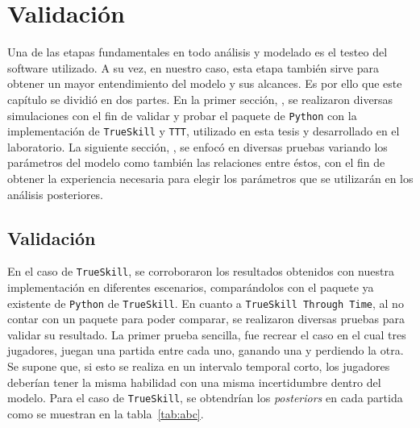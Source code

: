\documentclass[11pt,twoside,spanish]{report} %
\begin{document}





\chapter{Validaci\'on}
Una de las etapas fundamentales en todo an\'alisis y modelado es el testeo del software utilizado.
A su vez, en nuestro caso, esta etapa tambi\'en sirve para obtener un mayor entendimiento del modelo y sus alcances.
Es por ello que este cap\'itulo se dividi\'o en dos partes.
En la primer secci\'on, , se realizaron diversas simulaciones con el fin de validar y probar el paquete de \texttt{Python} con la implementaci\'on de \texttt{TrueSkill} y \texttt{TTT}, utilizado en esta tesis y desarrollado en el laboratorio.
La siguiente secci\'on, , se enfoc\'o en diversas pruebas variando los par\'ametros del modelo como tambi\'en las relaciones entre \'estos, con el fin de obtener la experiencia necesaria para elegir los par\'ametros que se utilizar\'an en los an\'alisis posteriores.


\section{Validaci\'on}\label{sec:validacion}

En el caso de \texttt{TrueSkill}, se corroboraron los resultados obtenidos con nuestra implementaci\'on en diferentes escenarios, compar\'andolos con el paquete ya existente de \texttt{Python} de \texttt{TrueSkill}.
En cuanto a \texttt{TrueSkill Through Time}, al no contar con un paquete para poder comparar, se realizaron diversas pruebas para validar su resultado.
La primer prueba sencilla, fue recrear el caso en el cual tres jugadores, juegan una partida entre cada uno, ganando una y perdiendo la otra.
Se supone que, si esto se realiza en un intervalo temporal corto, los jugadores deber\'ian tener la misma habilidad con una misma incertidumbre dentro del modelo.
Para el caso de \texttt{TrueSkill}, se obtendr\'ian los \textit{posteriors} en cada partida como se muestran en la tabla~\ref{tab:abc}.
\end{document}
